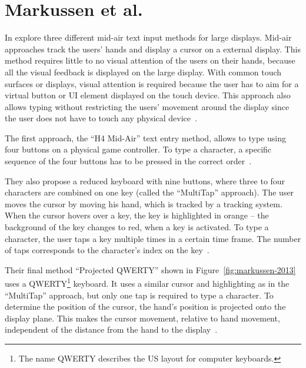 \section{Markussen et al.}\label{section:markussen-2013}
In {} \citeauthor{Markussen.2013} explore three different mid-air text input methods for large displays. Mid-air approaches track the users' hands and display a cursor on a external display. This method requires little to no visual attention of the users on their hands, because all the visual feedback is displayed on the large display. With common touch surfaces or displays, visual attention is required because the user has to aim for a virtual button or \gls{UI} element displayed on the touch device.
This approach also allows typing without restricting the users' movement around the display since the user does not have to touch any physical device~\cite[401]{Markussen.2013}.

The first approach, the \enquote{H4 Mid-Air} text entry method, allows to type using four buttons on a physical game controller. To type a character, a specific sequence of the four buttons has to be pressed in the correct order~\cite[406]{Markussen.2013}.

They also propose a reduced keyboard with nine buttons, where three to four characters are combined on one key (called the \enquote{MultiTap} approach). The user moves the cursor by moving his hand, which is tracked by a tracking system. When the cursor hovers over a key, the key is highlighted in orange -- the background of the key changes to red, when a key is activated. To type a character, the user taps a key multiple times in a certain time frame. The number of taps corresponds to the character's index on the key~\cite[407]{Markussen.2013}. %

Their final method \enquote{Projected QWERTY} shown in Figure~\ref{fig:markussen-2013} uses a QWERTY\footnote{The name QWERTY describes the US layout for computer keyboards.} keyboard. It uses a similar cursor and highlighting as in the \enquote{MultiTap} approach, but only one tap is required to type a character. To determine the position of the cursor, the hand's position is projected onto the display plane. This makes the cursor movement, relative to hand movement, independent of the distance from the hand to the display~\cite[408]{Markussen.2013}. 


